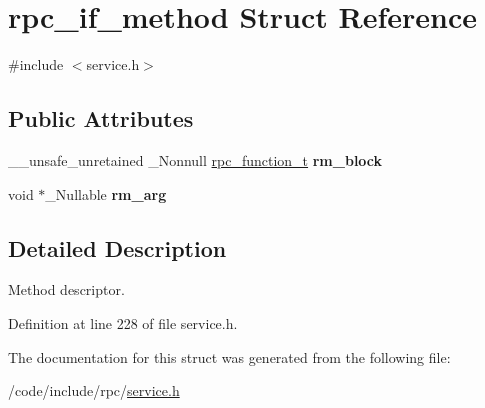 \hypertarget{structrpc__if__method}{}\section{rpc\+\_\+if\+\_\+method Struct Reference}
\label{structrpc__if__method}


{\ttfamily \#include $<$service.\+h$>$}

\subsection*{Public Attributes}
\begin{DoxyCompactItemize}
\item 
\mbox{\label{structrpc__if__method_a479530c031d4da4fb1a3c6a38de19106}} 
\+\_\+\+\_\+unsafe\+\_\+unretained \+\_\+\+Nonnull \hyperlink{service_8h_ae49a22468cfcd4adfa558078e9e4e312}{rpc\+\_\+function\+\_\+t} {\bfseries rm\+\_\+block}
\item 
\mbox{\label{structrpc__if__method_a85a2f339a726ef4afb885cbf157c0998}} 
void $\ast$\+\_\+\+Nullable {\bfseries rm\+\_\+arg}
\end{DoxyCompactItemize}


\subsection{Detailed Description}
Method descriptor. 

Definition at line 228 of file service.\+h.



The documentation for this struct was generated from the following file\+:\begin{DoxyCompactItemize}
\item 
/code/include/rpc/\hyperlink{service_8h}{service.\+h}\end{DoxyCompactItemize}
